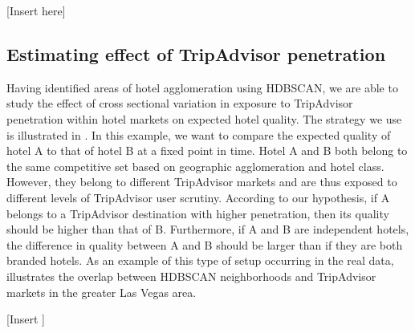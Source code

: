 \documentclass{informs_mod} %
\begin{document}
[Insert  here]

\subsection{Estimating effect of TripAdvisor penetration}

Having identified areas of hotel agglomeration using HDBSCAN, we are able to study the effect of cross sectional variation in exposure to TripAdvisor penetration within hotel markets on expected hotel quality. The strategy we use is illustrated in . In this example, we want to compare the expected quality of hotel A to that of hotel B at a fixed point in time. Hotel A and B both belong to the same competitive set based on geographic agglomeration and hotel class. However, they belong to different TripAdvisor markets and are thus exposed to different levels of TripAdvisor user scrutiny. According to our hypothesis, if A belongs to a TripAdvisor destination with higher penetration, then its quality should be higher than that of B. Furthermore, if A and B are independent hotels, the difference in quality between A and B should be larger than if they are both branded hotels. As an example of this type of setup occurring in the real data,  illustrates the overlap between HDBSCAN neighborhoods and TripAdvisor markets in the greater Las Vegas area.

[Insert ]
\end{document}
